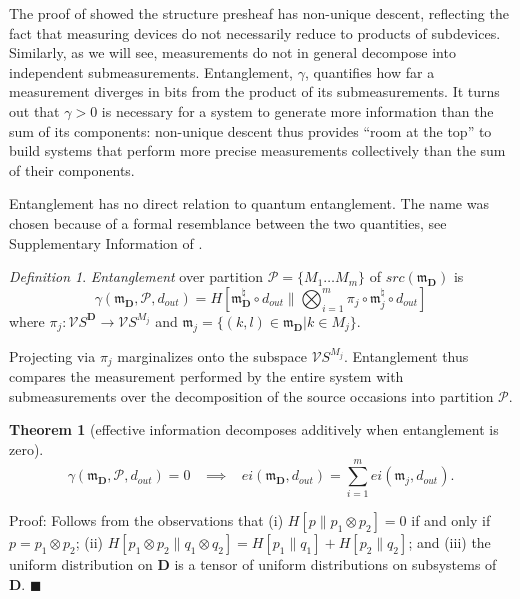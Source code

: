 \documentclass[12pt]{article}
\newcommand{\vecify}{{\mathcal V}}
\newcommand{\Sit}{{S}}
\newcommand{\univ}{{\mathbf D}}
\newcommand{\uout}{{d_{out}}}
\newcommand{\eop}{{$\blacksquare$}}
\newcommand{\fm}{{\mathfrak m}}
\newcommand{\cP}{{\mathcal P}}
\newtheorem{thm}{Theorem}
\theoremstyle{remark}
\newtheorem{defn}{Definition}
\begin{document}
The proof of %
showed the structure presheaf has non-unique descent, 
reflecting the fact that measuring devices do not necessarily 
reduce to products of subdevices. Similarly, as we will see, 
measurements do not in general decompose into independent 
submeasurements. Entanglement, $\gamma$, quantifies how far a 
measurement diverges in bits from the product of its 
submeasurements. It turns out that $\gamma>0$ is necessary for 
a system to generate more information than the sum of its 
components: non-unique descent thus provides ``room at the top''
to build systems that perform more precise measurements 
collectively than the sum of their components. 

Entanglement has no direct relation to quantum entanglement. 
The name was chosen because of a formal resemblance between the 
two quantities, see Supplementary Information of \cite{bt:09}.

\begin{defn}
    \label{d:gamma}
	\emph{Entanglement} over partition $\cP=\{M_1\ldots M_m\}$ 
    of $src(\fm_\univ)$ is
	\begin{equation*}
		\gamma(\fm_\univ,\cP,\uout)
		=H\left[\fm_\univ^\natural\circ \uout\Big\|
        \bigotimes_{i=1}^m \pi_j\circ \fm_j^\natural\circ 
        \uout\right]
	\end{equation*}
	where $\pi_j:\vecify \Sit^\univ\rightarrow 
    \vecify \Sit^{M_j}$ and $\fm_j=\{(k,l)\in 
    \fm_\univ|k\in M_j\}$.
\end{defn}

Projecting via $\pi_j$ marginalizes onto the subspace 
$\vecify\Sit^{M_j}$. Entanglement thus compares the measurement 
performed by the entire system with submeasurements over the 
decomposition of the source occasions into partition $\cP$.

\begin{thm}
	[effective information decomposes additively when 
    entanglement is zero]
	\label{t:gamma}
	\begin{equation*}
		\gamma(\fm_\univ,\cP,\uout) = 0
		\,\,\,\,\,\implies\,\,\,\,\,
		ei(\fm_\univ,\uout)=\sum_{i=1}^m ei(\fm_j,\uout).
	\end{equation*}
\end{thm}

\noindent
Proof: Follows from the observations that (i) 
$H[p\|p_1\otimes p_2]=0$ if and only if $p=p_1\otimes p_2$; (ii)
$H[p_1\otimes p_2\| q_1\otimes q_2]=H[p_1\|q_1]+H[p_2\|q_2]$; 
and (iii) the uniform distribution on $\univ$ is a tensor of 
uniform distributions on subsystems of $\univ$.
\eop
\end{document}

